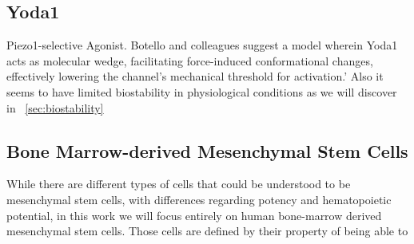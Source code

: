 \subsection{Yoda1}
Piezo1-selective Agonist.
Botello and colleagues suggest a model wherein Yoda1 acts as molecular wedge, facilitating force-induced conformational changes, effectively lowering the channel's mechanical threshold for activation.'\cite{BotelloSmith.2019} Also it seems to have limited biostability in physiological conditions as we will discover in ~\vref{sec:biostability} 

\subsection{Bone Marrow-derived Mesenchymal Stem Cells}
While there are different types of cells that could be understood to be mesenchymal stem cells, with differences regarding potency and hematopoietic potential, in this work we will focus entirely on human bone-marrow derived mesenchymal stem cells. Those cells are defined by their property of being able to 

